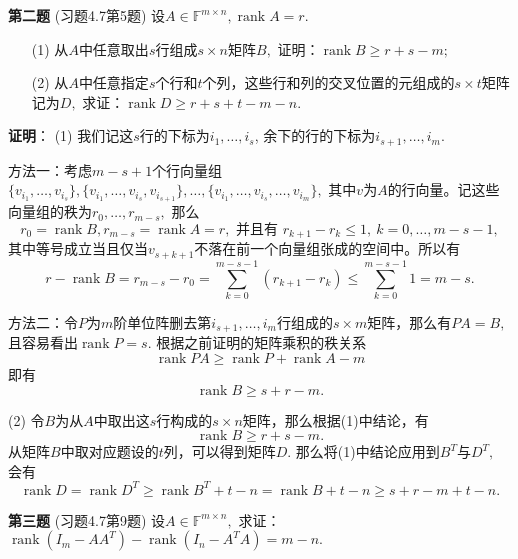 \fi  %

\newpageorvspace

{\bf 第二题} (习题4.7第5题) 设$A \in \mathbb{F}^{m\times n}, \operatorname{rank} A = r.$
\begin{itemize}
\item[(1)] 从$A$中任意取出$s$行组成$s\times n$矩阵$B,$ 证明：$\operatorname{rank} B \geqslant r + s - m;$
\item[(2)] 从$A$中任意指定$s$个行和$t$个列，这些行和列的交叉位置的元组成的$s\times t$矩阵记为$D,$ 求证：$\operatorname{rank} D \geqslant r + s + t - m - n.$
\end{itemize}

\ifIncludeAnswer

\newpageorvspace

\textbf{证明}： (1) 我们记这$s$行的下标为$i_1, \ldots, i_s$, 余下的行的下标为$i_{s+1}, \ldots, i_m.$

方法一：考虑$m-s+1$个行向量组$\{v_{i_1}, \ldots, v_{i_s}\}, \{v_{i_1}, \ldots, v_{i_s}, v_{i_{s+1}}\}, \ldots, \{v_{i_1}, \ldots, v_{i_s}, \ldots, v_{i_m}\},$ 其中$v$为$A$的行向量。记这些向量组的秩为$r_0, \ldots, r_{m-s},$ 那么
$$r_0 = \operatorname{rank} B, r_{m-s} = \operatorname{rank} A = r, \text{ 并且有 } r_{k+1} - r_k \leqslant 1, ~ k = 0, \ldots, m-s-1,$$
其中等号成立当且仅当$v_{s+k+1}$不落在前一个向量组张成的空间中。所以有
$$r - \operatorname{rank} B = r_{m-s} - r_0 = \sum\limits_{k=0}^{m-s-1} (r_{k+1} - r_k) \leqslant \sum\limits_{k=0}^{m-s-1} 1 = m-s.$$

方法二：令$P$为$m$阶单位阵删去第$i_{s+1}, \ldots, i_m$行组成的$s\times m$矩阵，那么有$PA = B,$ 且容易看出$\operatorname{rank} P = s.$ 根据之前证明的矩阵乘积的秩关系
$$\operatorname{rank} PA \geqslant \operatorname{rank} P + \operatorname{rank} A - m$$
即有
$$\operatorname{rank} B \geqslant s + r - m.$$

(2) 令$B$为从$A$中取出这$s$行构成的$s\times n$矩阵，那么根据(1)中结论，有
$$\operatorname{rank} B \geqslant r+s-m.$$
从矩阵$B$中取对应题设的$t$列，可以得到矩阵$D.$ 那么将(1)中结论应用到$B^T$与$D^T,$ 会有
$$\operatorname{rank} D = \operatorname{rank} D^T \geqslant \operatorname{rank} B^T + t - n = \operatorname{rank} B + t - n \geqslant s + r - m + t - n.$$


\fi  %

\newpageorvspace

{\bf 第三题} (习题4.7第9题) 设$A \in \mathbb{F}^{m\times n},$ 求证：$\operatorname{rank}(I_m - AA^T) - \operatorname{rank}(I_n - A^TA) = m - n.$

